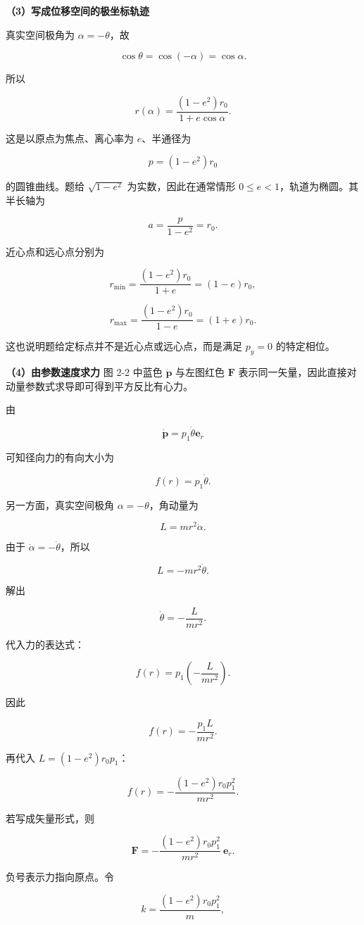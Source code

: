 \documentclass[12pt,a4paper,UTF8]{ctexart}
\begin{document}
\textbf{（3）写成位移空间的极坐标轨迹}

真实空间极角为 \(\alpha=-\theta\)，故

\[\cos\theta=\cos(-\alpha)=\cos\alpha.\]

所以

\[\boxed{
r(\alpha)=\frac{(1-e^2)r_0}{1+e\cos\alpha}
}.\]

这是以原点为焦点、离心率为 \(e\)、半通径为

\[p=(1-e^2)r_0\]

的圆锥曲线。题给 \(\sqrt{1-e^2}\) 为实数，因此在通常情形
\(0\le e<1\)，轨道为椭圆。其半长轴为

\[a=\frac{p}{1-e^2}=r_0.\]

近心点和远心点分别为

\[r_{\min}=\frac{(1-e^2)r_0}{1+e}=(1-e)r_0,\]

\[r_{\max}=\frac{(1-e^2)r_0}{1-e}=(1+e)r_0.\]

这也说明题给定标点并不是近心点或远心点，而是满足 \(p_y=0\) 的特定相位。

\textbf{（4）由参数速度求力} 图 2-2 中蓝色 \(\dot{\bm p}\) 与左图红色
\(\bm F\) 表示同一矢量，因此直接对动量参数式求导即可得到平方反比有心力。

由

\[\dot{\bm p}=p_1\dot\theta\bm e_r\]

可知径向力的有向大小为

\[f(r)=p_1\dot\theta.\]

另一方面，真实空间极角 \(\alpha=-\theta\)，角动量为

\[L=mr^2\dot\alpha.\]

由于 \(\dot\alpha=-\dot\theta\)，所以

\[L=-mr^2\dot\theta.\]

解出

\[\dot\theta=-\frac{L}{mr^2}.\]

代入力的表达式：

\[f(r)=p_1\left(-\frac{L}{mr^2}\right).\]

因此

\[f(r)=-\frac{p_1L}{m r^2}.\]

再代入 \(L=(1-e^2)r_0p_1\)：

\[\boxed{
f(r)=-\frac{(1-e^2)r_0p_1^2}{m r^2}
}.\]

若写成矢量形式，则

\[\boxed{
\bm F=-\frac{(1-e^2)r_0p_1^2}{m r^2}\ \bm e_r
}.\]

负号表示力指向原点。令

\[k=\frac{(1-e^2)r_0p_1^2}{m},\]
\end{document}
